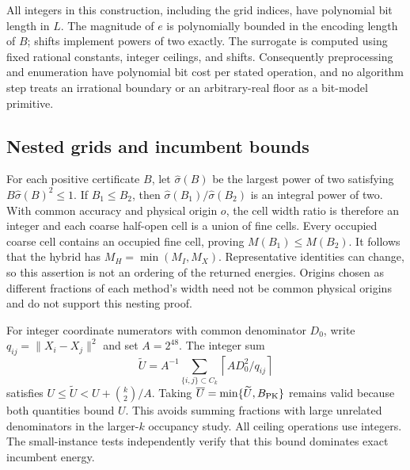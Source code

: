 \documentclass[a4paper,12pt]{article}
\numberwithin{equation}{section}
\begin{document}
All integers in this construction, including the grid indices, have polynomial bit length in $L$.
The magnitude of $e$ is polynomially bounded in the encoding length of $B$; shifts implement
powers of two exactly. The surrogate is computed using fixed rational constants, integer ceilings,
and shifts. Consequently preprocessing and enumeration have polynomial bit cost per stated
operation, and no algorithm step treats an irrational boundary or an arbitrary-real floor as a
bit-model primitive.

\subsection{Nested grids and incumbent bounds}\label{app:nesting}
For each positive certificate $B$, let $\widehat\sigma(B)$ be the largest power of two satisfying
$B\widehat\sigma(B)^2\le1$. If $B_1\le B_2$, then $\widehat\sigma(B_1)/\widehat\sigma(B_2)$ is an
integral power of two. With common accuracy and physical origin $o$, the cell width ratio is
therefore an integer and each coarse half-open cell is a union of fine cells. Every occupied
coarse cell contains an occupied fine cell, proving $M(B_1)\le M(B_2)$. It follows that the hybrid
has $M_H=\min(M_I,M_X)$. Representative identities can change, so this assertion is not an
ordering of the returned energies. Origins chosen as different fractions of each method's width
need not be common physical origins and do not support this nesting proof.

For integer coordinate numerators with common denominator $D_0$, write $q_{ij}=\|X_i-X_j\|^2$ and
set $A=2^{48}$. The integer sum
\[
\widetilde U=A^{-1}\sum_{\{i,j\}\subset C_k}\left\lceil A D_0^2/q_{ij}\right\rceil
\]
satisfies $U\le\widetilde U<U+\binom{k}{2}/A$. Taking $\overline U=\min\{\widetilde U,B_{\rm
PK}\}$ remains valid because both quantities bound $U$. This avoids summing fractions with large
unrelated denominators in the larger-$k$ occupancy study. All ceiling operations use integers. The
small-instance tests independently verify that this bound dominates exact incumbent energy.
\end{document}
